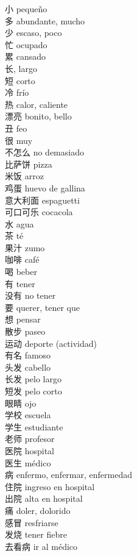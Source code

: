 \documentclass[13pt]{article}
\begin{document}
\begin{CJK*}{UTF8}{gkai}
\begin{multicols}{2}
\begin{pinyinscope}
小 \quad pequeño\\
多 \quad abundante, mucho\\
少 \quad escaso, poco\\
忙 \quad ocupado\\
累 \quad cansado\\
长, \quad largo\\
短 \quad corto\\
冷 \quad frío\\
热 \quad calor, caliente\\
漂亮 \quad bonito, bello\\
丑 \quad feo\\
很 \quad muy\\
不怎么 \quad no demasiado\\
比萨饼 \quad pizza\\
米饭 \quad arroz\\
鸡蛋 \quad huevo de gallina\\
意大利面 \quad espaguetti\\
可口可乐 \quad cocacola\\
水 \quad agua\\
茶 \quad té\\
果汁 \quad zumo\\
咖啡 \quad café\\
喝 \quad beber\\
有 \quad tener\\
没有 \quad no tener\\
要 \quad querer, tener que\\
想 \quad pensar\\
散步 \quad paseo\\
运动 \quad deporte (actividad)\\
有名 \quad famoso\\
头发 \quad cabello\\
长发 \quad pelo largo\\
短发 \quad pelo corto\\
眼睛 \quad ojo\\
学校 \quad escuela\\
学生 \quad estudiante\\
老师 \quad profesor\\
医院 \quad hospital\\
医生 \quad médico\\
病 \quad enfermo, enfermar, enfermedad\\
住院 \quad ingreso en hospital\\
出院 \quad alta en hospital\\
痛 \quad doler, dolorido\\
感冒 \quad resfriarse\\
发烧 \quad tener fiebre\\
去看病 \quad ir al médico\\

\end{pinyinscope}
\end{multicols}
\end{CJK*}
\end{document}
